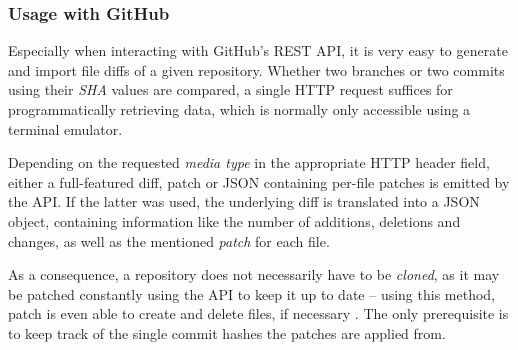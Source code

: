 \subsubsection{Usage with GitHub}
Especially when interacting with GitHub's REST API, it is very easy to generate and import file diffs of a given repository. Whether two branches or two commits using their \emph{SHA} values are compared, a single HTTP request suffices for programmatically retrieving data, which is normally only accessible using a terminal emulator.

Depending on the requested \emph{media type} in the appropriate HTTP header field, either a full-featured diff, patch or JSON containing per-file patches is emitted by the API. If the latter was used, the underlying diff is translated into a JSON object, containing information like the number of additions, deletions and changes, as well as the mentioned \emph{patch} for each file.

As a consequence, a repository does not necessarily have to be \emph{cloned}, as it may be patched constantly using the API to keep it up to date -- using this method, patch is even able to create and delete files, if necessary \cite[57]{mackenzie2003comparing}. The only prerequisite is to keep track of the single commit hashes the patches are applied from.
